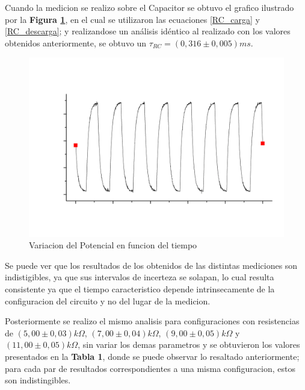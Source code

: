 \documentclass[11pt,a4paper]{article}
\begin{document}
Cuando la medicion se realizo sobre el Capacitor se obtuvo el grafico ilustrado por la \textbf{Figura \ref{fig:RC-CC}}, en el cual se utilizaron las ecuaciones \eqref{RC_carga} y \eqref{RC_descarga}; y realizandose un análisis idéntico al realizado con los valores obtenidos anteriormente, se obtuvo un $\tau_{RC}=(0,316 \pm 0,005) ms$.

\begin{figure}[H]
\centering
\includegraphics[scale=0.45]{RC-Caida_en_Capacitor}
  \caption{Variacion del Potencial en funcion del tiempo}
  \label{fig:RC-CC}
\end{figure}

Se puede ver que los resultados de los obtenidos de las distintas mediciones son indistigibles, ya que sus intervalos de incerteza se solapan, lo cual resulta consistente ya que el tiempo caracteristico depende intrinsecamente de la configuracion del circuito y no del lugar de la medicion.

Posteriormente se realizo el mismo analisis para configuraciones con resistencias de $(5,00\pm0,03)k\Omega$, $(7,00\pm0,04)k\Omega$, $(9,00\pm0,05)k\Omega$ y $(11,00\pm0,05)k\Omega$, sin variar los demas parametros y se obtuvieron los valores presentados en la \textbf{Tabla 1}, donde se puede observar lo resaltado anteriormente; para cada par de resultados correspondientes a una misma configuracion, estos son indistingibles.
\end{document}
